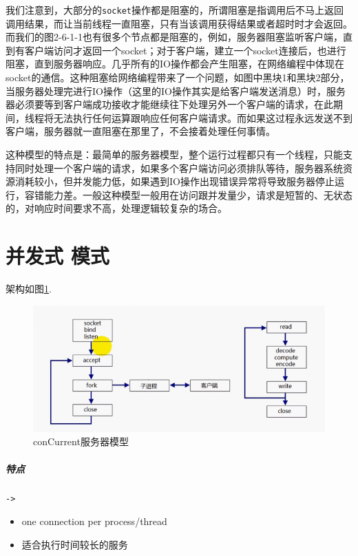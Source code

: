 \documentclass[UTF8,a4paper,12pt]{ctexbook}
\begin{document}
		我们注意到，大部分的\verb|socket|操作都是阻塞的，所谓阻塞是指调用后不马上返回调用结果，而让当前线程一直阻塞，只有当该调用获得结果或者超时时才会返回。而我们的图2-6-1-1也有很多个节点都是阻塞的，例如，服务器阻塞监听客户端，直到有客户端访问才返回一个socket；对于客户端，建立一个socket连接后，也进行阻塞，直到服务器响应。几乎所有的IO操作都会产生阻塞，在网络编程中体现在socket的通信。这种阻塞给网络编程带来了一个问题，如图中黑块1和黑块2部分，当服务器处理完进行IO操作（这里的IO操作其实是给客户端发送消息）时，服务器必须要等到客户端成功接收才能继续往下处理另外一个客户端的请求，在此期间，线程将无法执行任何运算跟响应任何客户端请求。而如果这过程永远发送不到客户端，服务器就一直阻塞在那里了，不会接着处理任何事情。
		
		这种模型的特点是：最简单的服务器模型，整个运行过程都只有一个线程，只能支持同时处理一个客户端的请求，如果多个客户端访问必须排队等待，服务器系统资源消耗较小，但并发能力低，如果遇到IO操作出现错误异常将导致服务器停止运行，容错能力差。一般这种模型一般用在访问跟并发量少，请求是短暂的、无状态的，对响应时间要求不高，处理逻辑较复杂的场合。
	
		
	
	\newpage		
	\section{并发式 模式}
		
		架构如图\ref{conCurrent}.
		
		\begin{figure}[htbp]
			\centering
			\includegraphics[scale = 0.6]{figures/concurrent.png}
			\caption{conCurrent服务器模型}
			\label{conCurrent}
		\end{figure}
		
		\subparagraph{特点}\verb|->|
			\begin{itemize}[itemindent = 1em]
				\item one connection per process/thread
				\item 适合执行时间较长的服务
			\end{itemize}	
\end{document}
